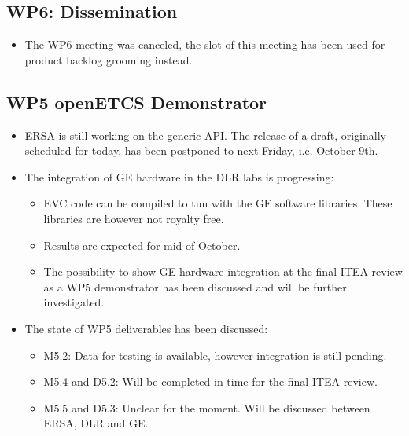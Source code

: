 \documentclass[a4paper, 11pt]{article}
\begin{document}
\subsection{WP6: Dissemination}
\begin{itemize}
\item The WP6 meeting was canceled, the slot of this meeting has been used for product backlog grooming instead.
\end{itemize}

\subsection{WP5 openETCS Demonstrator}
\begin{itemize}
\item ERSA is still working on the generic API. The release of a draft, originally  scheduled for today, has been postponed to next Friday, i.e. October 9th.
\item The integration of GE hardware in the DLR labs is progressing:
	\begin{itemize}
	\item EVC code can be compiled to tun with the GE software libraries. These libraries are however not royalty free.
	\item Results are expected for mid of October.
	\item The possibility to show GE hardware integration at the final ITEA review as a WP5 demonstrator has been discussed and will be further investigated.
	\end{itemize}
\item The state of WP5 deliverables has been discussed:
	\begin{itemize}
	\item M5.2: Data for testing is available, however integration is still pending.
	\item M5.4 and D5.2: Will be completed in time for the final ITEA review.
	\item M5.5 and D5.3: Unclear for the moment. Will be discussed between ERSA, DLR and GE.
	\end{itemize}
\end{itemize}
\end{document}
